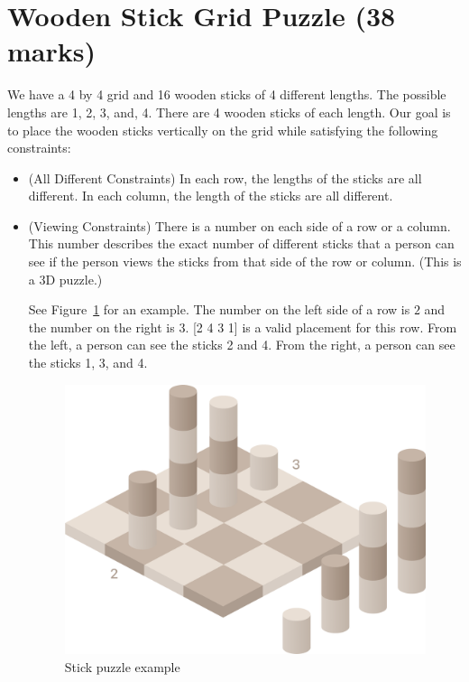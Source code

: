 \documentclass[12pt]{article}
\begin{document}
\newpage
\section{Wooden Stick Grid Puzzle (38 marks)}

We have a 4 by 4 grid and 16 wooden sticks of 4 different lengths. The possible lengths are 1, 2, 3, and, 4. There are 4 wooden sticks of each length. Our goal is to place the wooden sticks vertically on the grid while satisfying the following constraints:
\begin{itemize}

\item (All Different Constraints) In each row, the lengths of the sticks are all different. In each column, the length of the sticks are all different.
    
\item (Viewing Constraints) There is a number on each side of a row or a column. This number describes the exact number of different sticks that a person can see if the person views the sticks from that side of the row or column. (This is a 3D puzzle.)
    
See Figure~\ref{fig:stick_puzzle_example} for an example. 
The number on the left side of a row is $2$ and the number on the right is $3$. [2 4 3 1] is a valid placement for this row. From the left, a person can see the sticks 2 and 4. From the right, a person can see the sticks 1, 3, and 4. 
    
\begin{figure}[ht!]
    \centering
    \includegraphics[scale=0.15]{images_posted/stick_puzzle.png}
    \caption{Stick puzzle example}
    \label{fig:stick_puzzle_example}
\end{figure}

    
\end{itemize}
\end{document}
